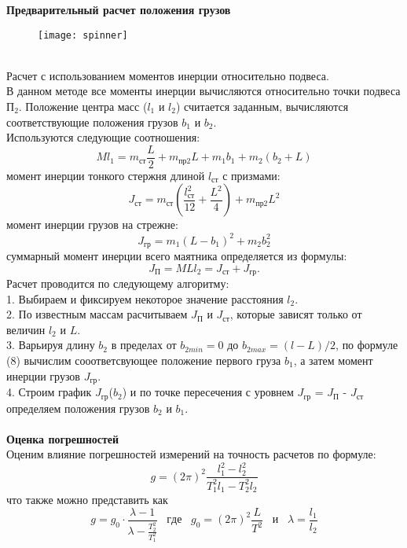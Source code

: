 \documentclass[a4paper, 12pt]{article}
\begin{document}
\textbf{Предварительный расчет положения грузов}
\begin{figure}[h!]
	\centering
	\texttt{[image: spinner]}
	\caption{}
\end{figure}\\
Расчет с использованием моментов инерции относительно подвеса.\\ В данном методе все моменты инерции вычисляются относительно точки подвеса $П_2$. Положение центра масс ($l_1$ и $l_2$) считается заданным, вычисляются соответствующие положения грузов $b_1$ и $b_2$.\\Используются следующие соотношения:\\
\begin{equation}
Ml_1 = m_{ст}\frac{L}{2} + m_{пр2}L + m_1b_1 + m_2(b_2 + L)
\end{equation}
момент инерции тонкого стержня длиной $l_{ст}$ с призмами:
$$ J_{ст} = m_{ст}(\frac{l_{ст}^2}{12} +\frac{L^2}{4}) + m_{пр2}L^2$$
момент инерции грузов на стрежне:
$$J_{гр} = m_1(L - b_1)^2 + m_2b_2^2 $$
суммарный момент инерции всего маятника определяется из формулы:
$$J_П = MLl_2 = J_{ст} + J_{гр}.$$
Расчет проводится по следующему алгоритму:\\
1.	Выбираем и фиксируем некоторое значение расстояния $l_2$.\\
2.	По известным массам расчитываем $J_П$ и $J_{ст}$, которые зависят только от величин $l_2$ и $L$.\\
3.	Варьируя длину $b_2$ в пределах от $b_{2min} = 0$ до
$b_{2max} = (l -L)/2$, по формуле (8) вычислим сооответсвующее положение первого груза $b_1$, а затем момент инерции грузов $J_{гр}$.\\
4.	Строим график $J_{гр}$($b_2$) и по точке пересечения с уровнем $J_{гр}$ = $J_{П}$ - $J_{ст}$ определяем положения грузов $b_2$ и $b_1$.\\\\
\textbf{Оценка погрешностей}\\
Оценим влияние погрешностей измерений на точность расчетов по формуле:
\begin{equation}
 g = (2\pi)^2\frac{l_1^2 - l_2^2}{T_1^2l_1 - T_2^2l_2}	
\end{equation}
что также можно представить как
\begin{equation}
	g = g_0\cdot\frac{\lambda - 1}{\lambda-\frac{T_2^2}{T_1^2}}	\hspace{10pt} где\hspace{10pt}  g_0 = (2\pi)^2\frac{L}{T^2} \hspace{10pt} и \hspace{10pt} \lambda = \frac{l_1}{l_2}
\end{equation}
\end{document}
